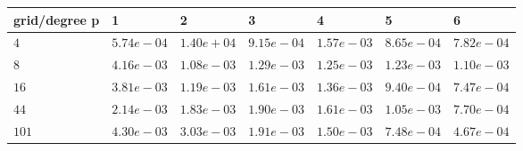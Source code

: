\begin{tabular}{lllllll}
\hline
 grid/degree p   & 1          & 2          & 3          & 4          & 5          & 6          \\
\hline
 $4$             & $5.74e-04$ & $1.40e+04$ & $9.15e-04$ & $1.57e-03$ & $8.65e-04$ & $7.82e-04$ \\
 $8$             & $4.16e-03$ & $1.08e-03$ & $1.29e-03$ & $1.25e-03$ & $1.23e-03$ & $1.10e-03$ \\
 $16$            & $3.81e-03$ & $1.19e-03$ & $1.61e-03$ & $1.36e-03$ & $9.40e-04$ & $7.47e-04$ \\
 $44$            & $2.14e-03$ & $1.83e-03$ & $1.90e-03$ & $1.61e-03$ & $1.05e-03$ & $7.70e-04$ \\
 $101$           & $4.30e-03$ & $3.03e-03$ & $1.91e-03$ & $1.50e-03$ & $7.48e-04$ & $4.67e-04$ \\
\hline
\end{tabular}